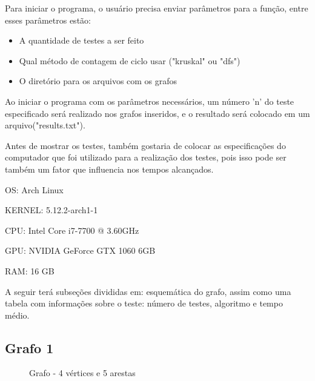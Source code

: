 \documentclass[12pt]{article}
\begin{document}
  Para iniciar o programa, o usuário precisa enviar parâmetros para a função, entre esses parâmetros estão:

  \begin{itemize}
    \item A quantidade de testes a ser feito
    \item Qual método de contagem de ciclo usar ("kruskal" ou "dfs")
    \item O diretório para os arquivos com os grafos
  \end{itemize}

  Ao iniciar o programa com os parâmetros necessários, um número 'n' do teste especificado 
  será realizado nos grafos inseridos, e o resultado será colocado em um arquivo("results.txt").

  Antes de mostrar os testes, também gostaria de colocar as especificações do computador 
  que foi utilizado para a realização dos testes, pois isso pode ser também um fator 
  que influencia nos tempos alcançados.

  OS: Arch Linux
  
  KERNEL: 5.12.2-arch1-1
  
  CPU: Intel Core i7-7700 @ 3.60GHz
  
  GPU: NVIDIA GeForce GTX 1060 6GB
  
  RAM: 16 GB
  
  A seguir terá subseções divididas em: esquemática do grafo, assim como 
  uma tabela com informações sobre o teste: número de testes, algoritmo e
  tempo médio.

  \newpage 

  \subsection{Grafo 1}

  \begin{figure}[ht]
    \centering
    \caption{Grafo  - 4 vértices e 5 arestas }

  \end{figure}
\end{document}
